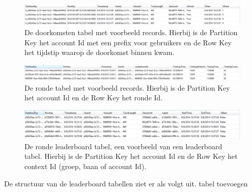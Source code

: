 \begin{figure}[ht]
  \begin{center}
  \includegraphics[width=.6\textwidth]{style/images/userPassingsStructure}    
  \end{center}
  \caption{De doorkomsten tabel met voorbeeld records. Hierbij is de Partition Key het account Id met een prefix voor gebruikers en de Row Key het tijdstip waarop de doorkomst binnen kwam.}
  \label{fig:userPassingTableStructure}
\end{figure}

\begin{figure}[ht]
  \begin{center}
  \includegraphics[width=.6\textwidth]{style/images/lapLeaderboardStructure}    
  \end{center}
  \caption{De ronde tabel met voorbeeld records. Hierbij is de Partition Key het account Id en de Row Key het ronde Id.}
  \label{fig:lapTableStructure}
\end{figure}

\begin{figure}[ht]
  \begin{center}
  \includegraphics[width=.6\textwidth]{style/images/aggregationLapsStructure}    
  \end{center}
  \caption{De ronde leaderboard tabel, een voorbeeld van een leaderboard tabel. Hierbij is de Partition Key het account Id en de Row Key het context Id (groep, baan of account Id).}
  \label{fig:entiteiten}
\end{figure}

De structuur van de leaderboard tabellen ziet er als volgt uit.
{\color{red} tabel toevoegen}